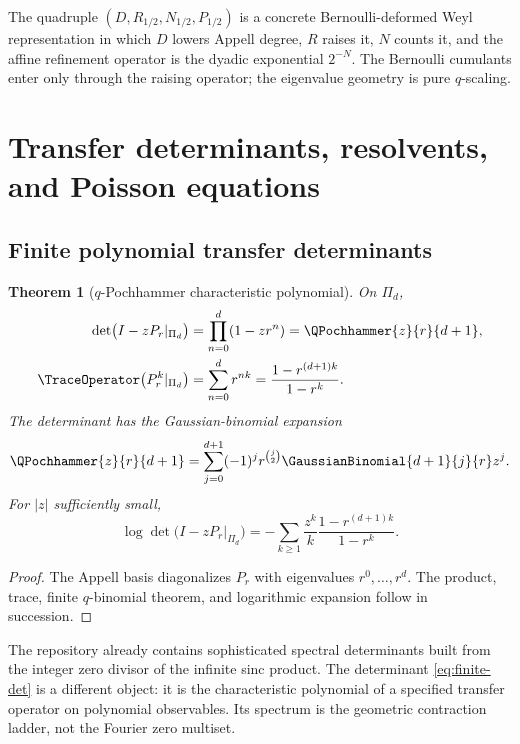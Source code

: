 \documentclass[11pt,a4paper]{article}
\newtheorem{theorem}{Theorem}[section]
\theoremstyle{definition}
\theoremstyle{remark}
\begin{document}
\begin{resultbox}
The quadruple $(D,R_{1/2},N_{1/2},P_{1/2})$ is a concrete Bernoulli-deformed Weyl representation in which $D$ lowers Appell degree, $R$ raises it, $N$ counts it, and the affine refinement operator is the dyadic exponential $2^{-N}$. The Bernoulli cumulants enter only through the raising operator; the eigenvalue geometry is pure $q$-scaling.
\end{resultbox}

\section{Transfer determinants, resolvents, and Poisson equations}
\label{sec:determinants}

\subsection{Finite polynomial transfer determinants}

\begin{theorem}[$q$-Pochhammer characteristic polynomial]
\label{thm:finite-determinant}
On $\Pi_d$,
\begin{align}
 \det\bigl(I-zP_r\vert_{\Pi_d}\bigr)
 &=\prod_{n=0}^{d}(1-zr^n)
 =\QPochhammer{z}{r}{d+1},
 \label{eq:finite-det}\\
 \TraceOperator\bigl(P_r^k\vert_{\Pi_d}\bigr)
 &=\sum_{n=0}^{d}r^{nk}
 =\frac{1-r^{(d+1)k}}{1-r^k}.
 \label{eq:finite-trace}
\end{align}
The determinant has the Gaussian-binomial expansion
\begin{equation}
 \QPochhammer{z}{r}{d+1}
 =\sum_{j=0}^{d+1}(-1)^jr^{\binom j2}
 \GaussianBinomial{d+1}{j}{r}z^j.
 \label{eq:finite-det-qbinom}
\end{equation}
For $|z|$ sufficiently small,
\begin{equation}
 \log\det\bigl(I-zP_r\vert_{\Pi_d}\bigr)
 =-\sum_{k\ge1}\frac{z^k}{k}
 \frac{1-r^{(d+1)k}}{1-r^k}.
 \label{eq:finite-lambert-log}
\end{equation}
\end{theorem}

\begin{proof}
The Appell basis diagonalizes $P_r$ with eigenvalues $r^0,\ldots,r^d$. The product, trace, finite $q$-binomial theorem, and logarithmic expansion follow in succession.
\end{proof}

The repository already contains sophisticated spectral determinants built from the integer zero divisor of the infinite sinc product. The determinant \eqref{eq:finite-det} is a different object: it is the characteristic polynomial of a specified transfer operator on polynomial observables. Its spectrum is the geometric contraction ladder, not the Fourier zero multiset.
\end{document}
